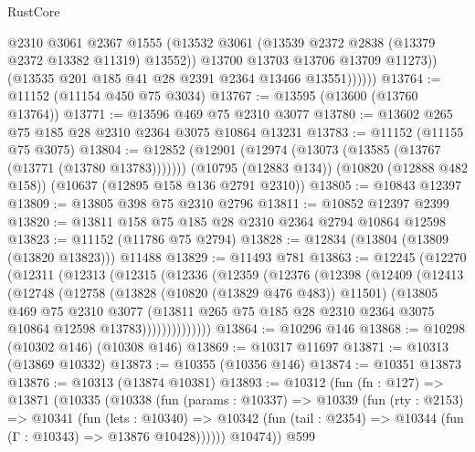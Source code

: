 \begin{lexlean}{RustCore}
\begin{coremodule}
                  @2310
                  @3061
                  @2367
                  @1555
                  (@13532 @3061 (@13539 @2372 @2838 (@13379 @2372 @13382 @11319) @13552))
                  @13700
                  @13703
                  @13706
                  @13709
                  @11273))
              (@13535 @201 @185 @41 @28 @2391 @2364 @13466 @13551))))))
@13764 := @11152 (@11154 @450 @75 @3034)
@13767 := @13595 (@13600 (@13760 @13764))
@13771 := @13596 @469 @75 @2310 @3077
@13780 := @13602 @265 @75 @185 @28 @2310 @2364 @3075 @10864 @13231
@13783 := @11152 (@11155 @75 @3075)
@13804 := @12852
    (@12901 (@12974 (@13073 (@13585 (@13767 (@13771 (@13780 @13783)))))))
    (@10795 (@12883 @134))
    (@10820 (@12888 @482 @158))
    (@10637 (@12895 @158 @136 @2791 @2310))
@13805 := @10843 @12397
@13809 := @13805 @398 @75 @2310 @2796
@13811 := @10852 @12397 @2399
@13820 := @13811 @158 @75 @185 @28 @2310 @2364 @2794 @10864 @12598
@13823 := @11152 (@11786 @75 @2794)
@13828 := @12834 (@13804 (@13809 (@13820 @13823))) @11488
@13829 := @11493 @781
@13863 := @12245
    (@12270
      (@12311
        (@12313
          (@12315
            (@12336
              (@12359
                (@12376
                  (@12398
                    (@12409
                      (@12413
                        (@12748
                          (@12758
                            (@13828 (@10820 (@13829 @476 @483)) @11501)
                            (@13805
                              @469
                              @75
                              @2310
                              @3077
                              (@13811
                                @265
                                @75
                                @185
                                @28
                                @2310
                                @2364
                                @3075
                                @10864
                                @12598
                                @13783))))))))))))))
@13864 := @10296 @146
@13868 := @10298 (@10302 @146) (@10308 @146)
@13869 := @10317 @11697
@13871 := @10313 (@13869 @10332)
@13873 := @10355 (@10356 @146)
@13874 := @10351 @13873
@13876 := @10313 (@13874 @10381)
@13893 := @10312
    (fun (fn : @127) =>
    @13871
      (@10335
        (@10338
          (fun (params : @10337) =>
          @10339
            (fun (rty : @2153) =>
            @10341
              (fun (lets : @10340) =>
              @10342 (fun (tail : @2354) => @10344 (fun (Γ : @10343) => @13876 @10428))))))
        @10474))
    @599

\end{coremodule}
\end{lexlean}
